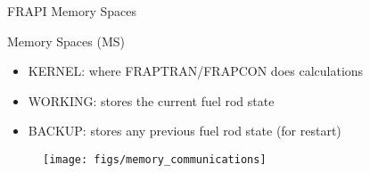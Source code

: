 \begin{frame}{FRAPI Memory Spaces}

  \scriptsize

    \begin{block}{Memory Spaces (MS)}
        \begin{itemize}
            \item KERNEL: where FRAPTRAN/FRAPCON does calculations
            \item WORKING: stores the current fuel rod state
            \item BACKUP: stores any previous fuel rod state (for restart)
        \end{itemize}
    \end{block}

  \begin{figure}[h]
    \texttt{[image: figs/memory\_communications]}
  \end{figure}  

\end{frame}